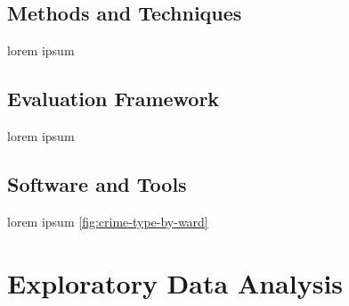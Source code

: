 \documentclass{report}
\begin{document}
	\newpage
	\section{Methods and Techniques}
	
	lorem ipsum
	
	\section{Evaluation Framework}
	
	lorem ipsum
	
	\section{Software and Tools}
	
	lorem ipsum \ref{fig:crime-type-by-ward}
	
	\chapter{Exploratory Data Analysis}
\end{document}
